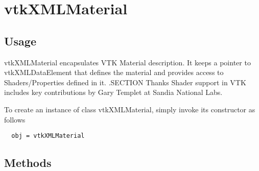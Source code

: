 \section{vtkXMLMaterial}

\subsection{Usage}

 vtkXMLMaterial encapsulates VTK Material description. It keeps a pointer
 to vtkXMLDataElement that defines the material and provides 
 access to Shaders/Properties defined in it.
 .SECTION Thanks
 Shader support in VTK includes key contributions by Gary Templet at 
 Sandia National Labs.

To create an instance of class vtkXMLMaterial, simply
invoke its constructor as follows
\begin{verbatim}
  obj = vtkXMLMaterial
\end{verbatim}
\subsection{Methods}

